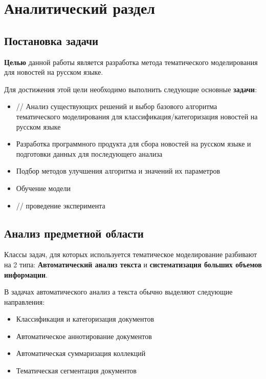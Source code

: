 \chapter{Аналитический раздел}

%
\section{Постановка задачи}
\textbf{Целью} данной работы является разработка метода тематического моделирования для новостей на русском языке.

Для достижения этой цели необходимо выполнить следующие основные \textbf{задачи}:

\begin{itemize}
    \item // Анализ существующих решений и выбор базового алгоритма тематического моделирования для классификация/категоризация новостей на русском языке
    \item Разработка программного продукта для сбора новостей на русском языке и подготовки данных для последующего анализа
    \item Подбор методов улучшения алгоритма и значений их параметров
    \item Обучение модели
    \item // проведение эксперимента
\end{itemize}

%
\section{Анализ предметной области}


Классы задач, для которых используется тематическое моделирование разбивают на 2 типа: \textbf{Автоматический анализ текста} и \textbf{систематизация больших объемов информации}.

В задачах автоматического анализ а текста обычно выделяют следующие направления:

\begin{itemize}
    \item Классификация и категоризация документов
    \item Автоматическое аннотирование документов
    \item Автоматическая суммаризация коллекций
    \item Тематическая сегментация документов
\end{itemize}

